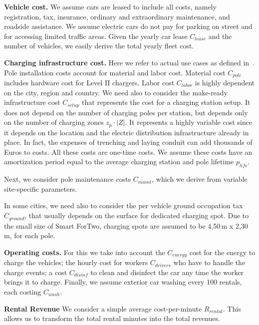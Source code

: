 \textbf{Vehicle cost.} We assume cars are leased to include all costs, namely registration, tax, insurance, ordinary and extraordinary maintenance, and roadside assistance. We assume electric cars do not pay for parking on street and for accessing limited traffic areas. Given the yearly car lease $C_{lease}$ and the number of vehicles, we easily derive the total yearly fleet cost.
 

\textbf{Charging infrastructure cost.} Here we refer to actual use cases as defined in~\cite{evInfrastructureCosts}. Pole installation costs account for material and labor cost. Material cost $C_{pole}$ includes hardware cost for Level II chargers.
Labor cost $C_{labor}$ is highly dependent on the city, region and country.
We need also to consider the make-ready infrastructure cost $C_{setup}$ that represents the cost for a charging station setup. It does not depend on the number of charging poles per station, but depends only on the number of charging zones $z_p\cdot|Z|$. It represents a highly variable cost since it depends on the location and the electric distribution infrastructure already in place. In fact, the expenses of trenching and laying conduit can add thousands of Euros to costs. %
All these costs are one-time costs. We assume these costs have an amortization period equal to the average charging station and pole lifetime $p_{life}$.

Next, we consider pole maintenance costs $C_{maint}$, which we derive from variable site-specific parameters.

In some cities, we need also to consider the per vehicle ground occupation tax $C_{ground}$, that usually depends on the surface for dedicated charging spot.
Due to the small size of Smart ForTwo, charging spots are assumed to be 4,50\,m x 2,30\,m, for each pole.


\textbf{Operating costs.} For this we take into account the $C_{energy}$ cost for the energy to charge the vehicles; the hourly cost for workers $C_{drivers}$ who have to handle the charge events; a cost $C_{disinf}$ to clean and disinfect the car any time the worker brings it to charge. Finally, we assume exterior car washing every 100 rentals, each costing $C_{wash}$.

\textbf{Rental Revenue} We consider a simple average cost-per-minute $R_{rental}$. This allows us to transform the total rental minutes into the total revenues.

